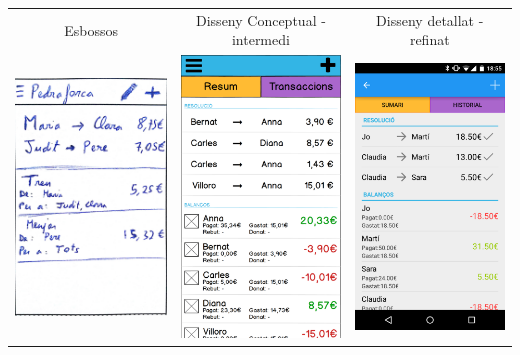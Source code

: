 \begin{table}
\begin{tabular}{| c | c | c |}
\hline
Esbossos & Disseny Conceptual - intermedi & Disseny detallat - refinat \\
\includegraphics[width=50mm]{1_Group.jpg} &
\includegraphics[width=50mm]{2_Group.png} &
\includegraphics[width=50mm]{3_Group.png}  \\
\hline
\end{tabular}
\end{table}

